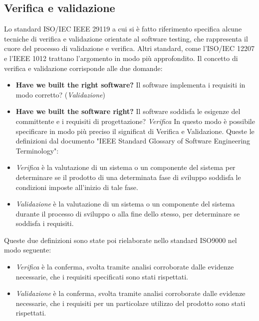 \subsection{Verifica e validazione}

Lo standard ISO/IEC IEEE 29119\cite{iso29119} a cui si è fatto riferimento specifica alcune tecniche di verifica e validazione orientate al software testing, che rappresenta il cuore del processo di validazione e verifica. Altri standard, come l'ISO/IEC 12207\cite{iso12207} e l'IEEE 1012\cite{ieee1012} trattano l'argomento in modo più approfondito.
Il concetto di verifica e validazione corrisponde alle due domande:
\begin{itemize}
\item \textbf{Have we built the right software?} Il software implementa i requisiti in modo corretto? (\textit{Validazione})
\item \textbf{Have we built the software right?} Il software soddisfa le esigenze del committente e i requisiti di progettazione? \textit{Verifica}
In questo modo è possibile specificare in modo più preciso il significat di Verifica e Validazione.
Queste le definizioni dal documento "IEEE Standard Glossary of Software Engineering Terminology"\cite{NistGlossary}:
\end{itemize}
\begin{itemize}
\item \textit{Verifica} è la valutazione di un sistema o un componente del sistema per determinare se il prodotto di una determinata fase di sviluppo soddisfa le condizioni imposte all'inizio di tale fase.
\item \textit{Validazione} è la valutazione di un sistema o un componente del sistema durante il processo di sviluppo o alla fine dello stesso, per determinare se soddisfa i requisiti.
\end{itemize}
Queste due definizioni sono state poi rielaborate nello standard ISO9000\cite{iso9000} nel modo seguente:
\begin{itemize}
\item \textit{Verifica} è la conferma, svolta tramite analisi corroborate dalle evidenze necessarie, che i requisiti specificati sono stati rispettati.
\item \textit{Validazione} è la conferma, svolta tramite analisi corroborate dalle evidenze necessarie, che i requisiti per un particolare utilizzo del prodotto sono stati rispettati.
\end{itemize}

